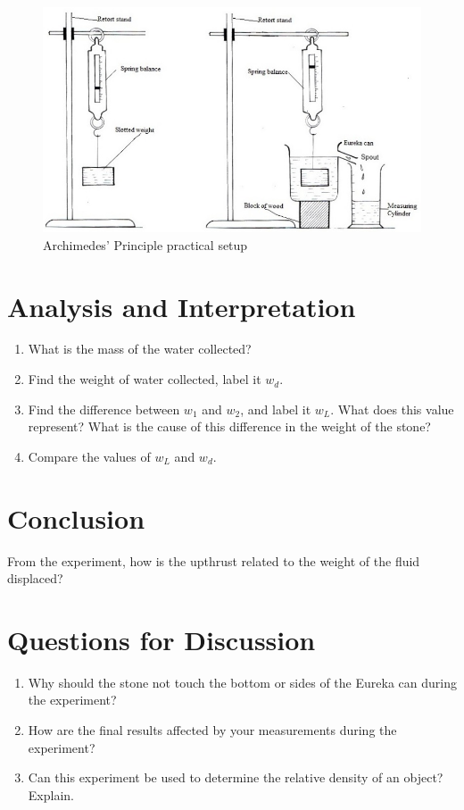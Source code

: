 \begin{figure}[h!]
\centering
\includegraphics[width=13cm]{./img/archimedes-1.jpg}
\caption{Archimedes' Principle practical setup}
\label{fig:archimedes-1}
\end{figure}

\section{Analysis and Interpretation}
\begin{enumerate}
\item What is the mass of the water collected?
\item Find the weight of water collected, label it $w_d$.
\item Find the difference between $w_1$ and $w_2$, and label it $w_L$. What does this value represent? What is the cause of this difference in the weight of the stone? 
\item Compare the values of $w_L$ and $w_d$.
\end{enumerate}

\section{Conclusion}
From the experiment, how is the upthrust related to the weight of the fluid displaced?

\section{Questions for Discussion}
\begin{enumerate}
\item Why should the stone not touch the bottom or sides of the Eureka can during the experiment?
\item How are the final results affected by your measurements during the experiment?
\item Can this experiment be used to determine the relative density of an object? Explain.
\end{enumerate}

